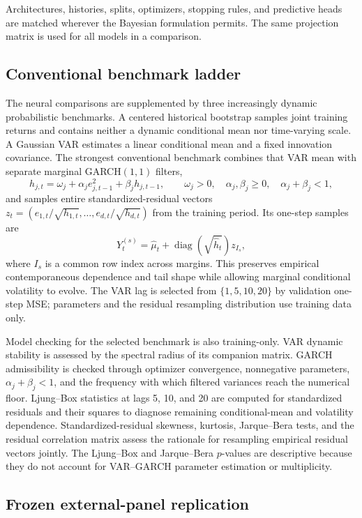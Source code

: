 \documentclass[11pt]{article}
\begin{document}
Architectures, histories, splits, optimizers, stopping rules, and predictive heads
are matched wherever the Bayesian formulation permits. The same projection matrix
is used for all models in a comparison.

\subsection{Conventional benchmark ladder}

The neural comparisons are supplemented by three increasingly dynamic
probabilistic benchmarks. A centered historical bootstrap samples joint training
returns and contains neither a dynamic conditional mean nor time-varying scale. A
Gaussian VAR estimates a linear conditional mean and a fixed innovation
covariance. The strongest conventional benchmark combines that VAR mean with
separate marginal GARCH$(1,1)$ filters,
\[
 h_{j,t}=\omega_j+\alpha_j e_{j,t-1}^2+\beta_j h_{j,t-1},
 \qquad \omega_j>0,\quad \alpha_j,\beta_j\geq0,\quad
 \alpha_j+\beta_j<1,
\]
and samples entire standardized-residual vectors
$z_t=(e_{1,t}/\sqrt{h_{1,t}},\ldots,e_{d,t}/\sqrt{h_{d,t}})$ from the training
period. Its one-step samples are
\[
 Y_t^{(s)}=\widehat\mu_t+\operatorname{diag}(\sqrt{\widehat h_t})z_{I_s},
\]
where $I_s$ is a common row index across margins. This preserves empirical
contemporaneous dependence and tail shape while allowing marginal conditional
volatility to evolve. The VAR lag is selected from $\{1,5,10,20\}$ by validation
one-step MSE; parameters and the residual resampling distribution use training
data only.

Model checking for the selected benchmark is also training-only. VAR dynamic
stability is assessed by the spectral radius of its companion matrix. GARCH
admissibility is checked through optimizer convergence, nonnegative parameters,
$\alpha_j+\beta_j<1$, and the frequency with which filtered variances reach the
numerical floor. Ljung--Box statistics at lags 5, 10, and 20 are computed for
standardized residuals and their squares to diagnose remaining conditional-mean
and volatility dependence. Standardized-residual skewness, kurtosis,
Jarque--Bera tests, and the residual correlation matrix assess the rationale for
resampling empirical residual vectors jointly. The Ljung--Box and Jarque--Bera
$p$-values are descriptive because they do not account for VAR--GARCH parameter
estimation or multiplicity.

\subsection{Frozen external-panel replication}
\end{document}
